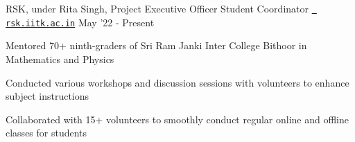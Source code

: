 
\begin{cventries}
    \cventry
  {RSK, under Rita Singh, Project Executive Officer}
  {Student Coordinator}
  {\texttt{\href{https://rsk.iitk.ac.in/}{\faGlobe{} rsk.iitk.ac.in}}}
  {May '22 - Present}
  {
    \begin{cvitems}
    \item Mentored 70+ ninth-graders of Sri Ram Janki Inter College Bithoor in Mathematics and Physics
    \item Conducted various workshops and discussion sessions with volunteers to enhance subject instructions
    \item Collaborated with 15+ volunteers to smoothly conduct regular online and offline classes for students
    \end{cvitems}
  }
\end{cventries}



\vspace{2mm}
